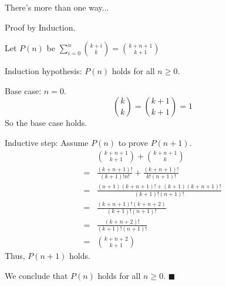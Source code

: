 \documentclass[../main.tex]{subfiles}
\begin{document}
\begin{questions}
\begin{parts}
  \end{parts}

  \question There's more than one way...
  \begin{solution}
    Proof by Induction.

    Let $P(n)$ be $\sum_{i=0}^{n}{\binom{k+i}{k}} = \binom{k+n+1}{k+1}$

    Induction hypothesis: $P(n)$ holds for all $n \ge 0$.

    Base case: $n = 0$.
    $$
    \binom{k}{k} = \binom{k+1}{k+1} = 1
    $$
    So the base case holds.


    Inductive step: Assume $P(n)$ to prove $P(n+1)$.
    \begin{align*}
        & \binom{k+n+1}{k+1} + \binom{k+n+1}{k} \\
      = & \frac{(k+n+1)!}{(k+1)! n!} + \frac{(k+n+1)!}{k! (n+1)!} \\
      = & \frac{(n+1)(k+n+1)! + (k+1)(k+n+1)!}{(k+1)! (n+1)!} \\
      = & \frac{(k+n+1)!(k+n+2)}{(k+1)!(n+1)!} \\
      = & \frac{(k+n+2)!}{(k+1)!(n+1)!} \\
      = & \binom{k+n+2}{k+1}
    \end{align*}
    Thus, $P(n+1)$ holds.

    We conclude that $P(n)$ holds for all $n \ge 0$. $\blacksquare$
  \end{solution}

\end{questions}
\end{document}
